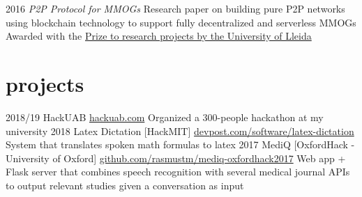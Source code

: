 \documentclass[]{friggeri-cv}
\begin{document}
\begin{entrylist}
  \entry
    {2016}
    {\emph{P2P Protocol for MMOGs}}
    {}
    {Research paper on building pure P2P networks using blockchain technology to support fully decentralized and serverless MMOGs
    \\Awarded with the \href{http://eps.blogs.udl.cat/2016/06/29/argelichrecerca/}{Prize to research projects by the University of Lleida}
    }
\end{entrylist}

\section{projects}

\begin{entrylist}
  \entry
    {2018/19}
    {HackUAB}
    {\href{https://hackuab.com}{hackuab.com}}
    {Organized a 300-people hackathon at my university}
  \entry
    {2018}
    {Latex Dictation [HackMIT]}
    {\href{https://devpost.com/software/latex-dictation}{devpost.com/software/latex-dictation}}
    {System that translates spoken math formulas to latex}
  \entry
    {2017}
    {MediQ [OxfordHack - University of Oxford]}
    {\href{https://github.com/rasmustm/mediq-oxfordhack2017}{github.com/rasmustm/mediq-oxfordhack2017}}
    {Web app + Flask server that combines speech recognition with several medical journal APIs to output relevant studies given a conversation as input}
\end{entrylist}
\end{document}
